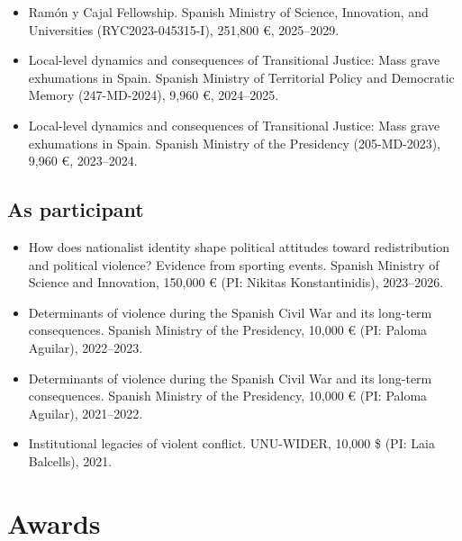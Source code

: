 \documentclass[a4paper, 12pt]{article}
\begin{document}
\begin{itemize}[leftmargin=12pt, itemsep=0pt]
	\item Ramón y Cajal Fellowship. Spanish Ministry of Science, Innovation, and Universities (RYC2023-045315-I), 251,800 €, 2025--2029.
	\item Local-level dynamics and consequences of Transitional Justice: Mass grave exhumations in Spain. Spanish Ministry of Territorial Policy and Democratic Memory (247-MD-2024), 9,960 €, 2024--2025.
  \item Local-level dynamics and consequences of Transitional Justice: Mass grave exhumations in Spain. Spanish Ministry of the Presidency (205-MD-2023), 9,960 €, 2023--2024.
\end{itemize}

\subsection*{As participant}

\begin{itemize}[leftmargin=12pt, itemsep=0pt]
	\item How does nationalist identity shape political attitudes toward redistribution and political violence? Evidence from sporting events. Spanish Ministry of Science and Innovation, 150,000 € (PI: Nikitas Konstantinidis), 2023--2026. %
	\item Determinants of violence during the Spanish Civil War and its long-term consequences. Spanish Ministry of the Presidency, 10,000 € (PI: Paloma Aguilar), 2022--2023. %
	\item Determinants of violence during the Spanish Civil War and its long-term consequences. Spanish Ministry of the Presidency, 10,000 € (PI: Paloma Aguilar), 2021--2022. %
	\item Institutional legacies of violent conflict. UNU-WIDER, 10,000 \$ (PI: Laia Balcells), 2021.
\end{itemize}

\section*{Awards}

\end{document}
